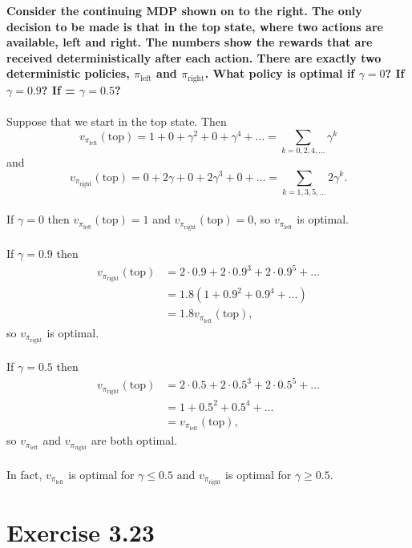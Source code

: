 \documentclass[a4paper,11pt]{article}
\numberwithin{equation}{section}
\theoremstyle{remark}
\begin{document}
\textbf{Consider the continuing MDP shown on to the right. The only decision to be made is that in the top state, where two actions are available, left and right. The numbers show the rewards that are received deterministically after each action. There are exactly two deterministic policies, $\pi_{\text{left}}$ and $\pi_{\text{right}}$. What policy is optimal if $\gamma = 0$? If  $\gamma = 0.9$? If  = $\gamma = 0.5$?}
\\ \\
Suppose that we start in the top state. Then
\[
	v_{\pi_{\text{left}}}(\text{top}) = 1 + 0 + \gamma^2 + 0 + \gamma^4 + \dots = \sum_{k=0, 2, 4, \dots} \gamma^k
\]
and
\[
	v_{\pi_{\text{right}}}(\text{top}) = 0 + 2\gamma + 0 + 2 \gamma^3 + 0 + \dots = \sum_{k=1, 3, 5, \dots} 2\gamma^k.
\]
\\
If $\gamma = 0$ then $v_{\pi_{\text{left}}}(\text{top}) = 1$ and $v_{\pi_{\text{right}}}(\text{top}) = 0$, so $v_{\pi_{\text{left}}}$ is optimal.
\\ \\ 
If $\gamma = 0.9$ then
\begin{align*}
	v_{\pi_{\text{right}}}(\text{top}) & = 2 \cdot 0.9 + 2 \cdot 0.9^3 + 2 \cdot 0.9^5 + \dots  \\
									   & = 1.8(1 + 0.9^2 + 0.9^4 + \dots ) \\
									   & = 1.8 v_{\pi_{\text{left}}}(\text{top}),
\end{align*}
so $v_{\pi_{\text{right}}}$ is optimal.
\\ \\
If $\gamma = 0.5$ then 
\begin{align*}
	v_{\pi_{\text{right}}}(\text{top}) & = 2 \cdot 0.5 + 2 \cdot 0.5^3 + 2 \cdot 0.5^5 + \dots  \\
									   & = 1 + 0.5^2 + 0.5^4 + \dots \\
									   & = v_{\pi_{\text{left}}}(\text{top}),
\end{align*}
so $v_{\pi_{\text{left}}}$ and $v_{\pi_{\text{right}}}$ are both optimal.
\\ \\
In fact, $v_{\pi_{\text{left}}}$ is optimal for $\gamma \leq 0.5$ and $v_{\pi_{\text{right}}}$ is optimal for $\gamma \geq 0.5$.
 	
\section{Exercise 3.23}
\end{document}
